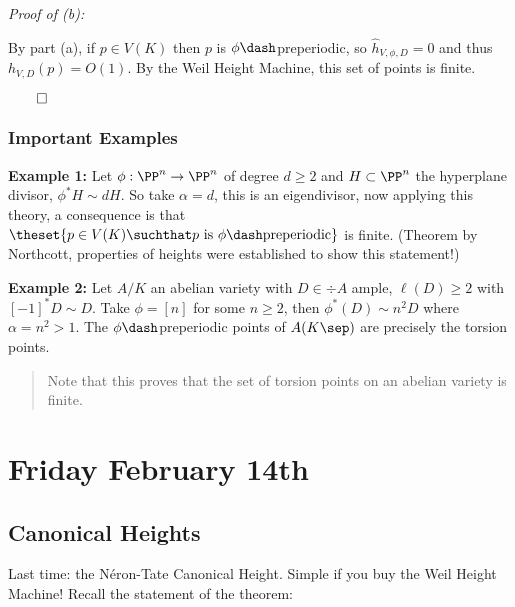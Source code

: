 \emph{Proof of (b):}

By part (a), if \(p\in V(K)\) then \(p\) is \(\phi\dash\)preperiodic, so
\(\hat h_{V, \phi, D} = 0\) and thus \(h_{V, D}(p) = O(1)\). By the Weil
Height Machine, this set of points is finite.

\(\qed\)

\hypertarget{important-examples}{%
\subsubsection{Important Examples}\label{important-examples}}

\textbf{Example 1:} Let \(\phi: \PP^n \to \PP^n\) of degree \(d\geq 2\)
and \(H\subset \PP^n\) the hyperplane divisor, \(\phi^* H \sim d H\). So
take \(\alpha = d\), this is an eigendivisor, now applying this theory,
a consequence is that
\(\theset{p\in V(K) \suchthat p \text{ is } \phi\dash\text{preperiodic}}\)
is finite. (Theorem by Northcott, properties of heights were established
to show this statement!)

\textbf{Example 2:} Let \(A/K\) an abelian variety with \(D\in \div A\)
ample, \(\ell(D) \geq 2\) with \([-1]^* D \sim D\). Take \(\phi = [n]\)
for some \(n\geq 2\), then \(\phi^*(D) \sim n^2 D\) where
\(\alpha = n^2 > 1\). The \(\phi\dash\)preperiodic points of
\(A(K\sep)\) are precisely the torsion points.

\begin{quote}
Note that this proves that the set of torsion points on an abelian
variety is finite.
\end{quote}

\hypertarget{friday-february-14th}{%
\section{Friday February 14th}\label{friday-february-14th}}

\hypertarget{canonical-heights}{%
\subsection{Canonical Heights}\label{canonical-heights}}

Last time: the Néron-Tate Canonical Height. Simple if you buy the Weil
Height Machine! Recall the statement of the theorem:


